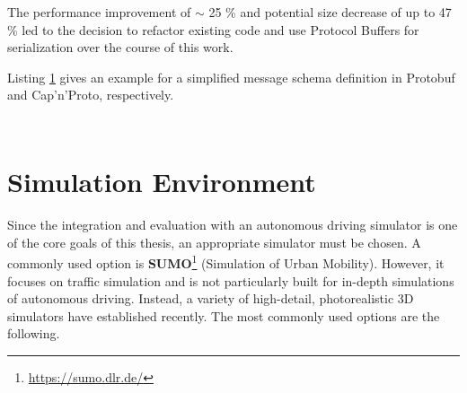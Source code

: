 The performance improvement of $\sim$ 25 \% and potential size decrease of up to 47 \% led to the decision to refactor existing code and use Protocol Buffers for serialization over the course of this work.

Listing \ref{lst:serialization_schema_examples} gives an example for a simplified message schema definition in Protobuf and Cap'n'Proto, respectively.

\begin{figure}[!h]
	\begin{minipage}{0.5\textwidth}
		\centering
		\inputminted[fontsize=\footnotesize]{text}{97_listings/protobuf_snippet.proto}
	\end{minipage}
	\begin{minipage}{0.5\textwidth}
		\centering
		\inputminted[fontsize=\footnotesize]{text}{97_listings/capnp_snippet.capnp}
	\end{minipage}
	\label{lst:serialization_schema_examples}
\end{figure}

\section{Simulation Environment}
\label{sec:implementation:simulation_environment}
Since the integration and evaluation with an autonomous driving simulator is one of the core goals of this thesis, an appropriate simulator must be chosen. A commonly used option is \textbf{SUMO}\footnote{\url{https://sumo.dlr.de/}} (Simulation of Urban Mobility). However, it focuses on traffic simulation and is not particularly built for in-depth simulations of autonomous driving. Instead, a variety of high-detail, photorealistic 3D simulators have established recently. The most commonly used options are the following.


